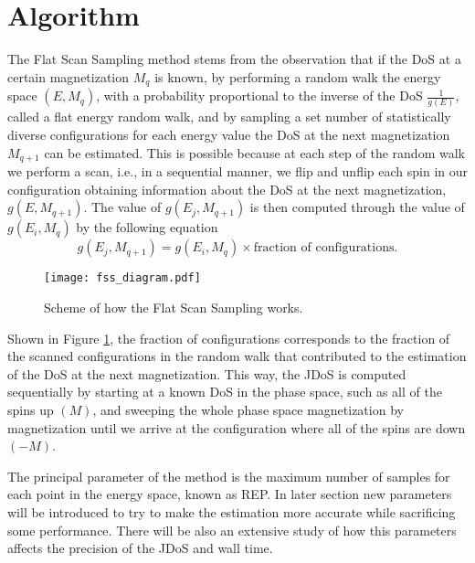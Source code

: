 \section{Algorithm}

	The Flat Scan Sampling method stems from the observation that if  the DoS at a certain magnetization $M_q$ is known, by performing a random walk the energy space $(E, M_q)$, with a probability proportional to the inverse of the DoS $\frac{1}{g(E)}$, called a flat energy random walk, and by sampling a set number of statistically diverse configurations for each energy value the DoS at the next magnetization $M_{q+1}$ can be estimated. 
This is possible because at each step of the random walk we perform a scan, i.e., in a sequential manner, we flip and unflip each spin in our configuration obtaining information about the DoS at the next magnetization, $g(E, M_{q+1})$. 
The value of $g(E_j, M_{q+1})$ is then computed through the value of $g(E_i, M_q)$ by the following equation
\begin{equation}\label{eq:FSS_JDoS}
	g(E_j, M_{q+1}) = g(E_i, M_q) \times \text{fraction of configurations}.
\end{equation}

\begin{figure}[h]
	\centering
	\texttt{[image: fss\_diagram.pdf]}
	\caption{Scheme of how the Flat Scan Sampling works.}
	\label{fss_dia}
\end{figure}

Shown in Figure \ref{fss_dia}, the fraction of configurations corresponds to the fraction of the scanned configurations in the random walk that contributed to the estimation of the DoS at the next magnetization. This way, the JDoS is computed sequentially by starting at a known DoS in the phase space, such as all of the spins up $(M)$, and sweeping the whole phase space magnetization by magnetization until we arrive at the configuration where all of the spins are down $(-M)$.

The principal parameter of the method is the maximum number of samples for each point in the energy space, known as REP. In later section new parameters will be introduced to try to make the estimation more accurate while sacrificing some performance.  There will be also an extensive study of how this parameters affects the precision of the JDoS and wall time.

